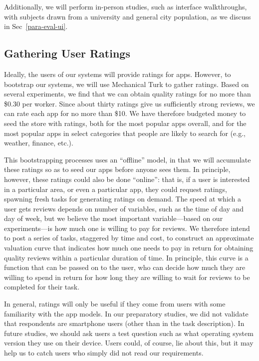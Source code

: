 \documentclass[11pt]{article}
\begin{document}
Additionally, we will perform in-person studies, such as interface
walkthroughs, with subjects drawn from a university and general city
population, as we discuss in Sec~\ref{para-eval-ui}.


\subsection{Gathering User Ratings}
\label{subsec-gather-ratings}

Ideally, the users of our systems will provide ratings for
apps. However, 
to bootstrap our systems, we will use Mechanical Turk to gather
ratings. Based on several experiments, we find that we can obtain
quality ratings for no more than \$0.30 per worker. Since about thirty
ratings give us sufficiently strong reviews, we can rate each
app for no more than \$10. We have therefore budgeted money to
seed the store with ratings, both for the most popular apps overall,
and for the most popular apps in select categories that people are
likely to search for (e.g., weather, finance, etc.).

This bootstrapping processes uses an ``offline'' model, in that we
will accumulate these ratings so as to seed our apps before anyone
sees them. In principle, however, these ratings could also be done
``online'': that is, if a user is interested in a particular area, or
even a particular app, they could request ratings, spawning fresh tasks for
generating ratings on demand. The speed at which a user gets reviews
depends on number of variables, such as the time of day and day of
week, but we believe the most important variable---based on our
experiments---is how much one is willing to pay for reviews. We
therefore intend to post a series of tasks, staggered by time and
cost, to construct an approximate valuation curve that indicates how
much one needs to pay in return for obtaining quality reviews within a
particular duration of time. In principle, this curve is a function
that can be passed on to the user, who can decide how much they are
willing to spend in return for how long they are willing to wait for
reviews to be completed for their task.

In general, ratings will only be useful if they come from users with some
familiarity with the app models.
In our preparatory studies, we did not validate that respondents are
smartphone users (other than in the task description). In future
studies, we should ask users a test question such as what operating
system version they use on their device. Users could, of course, lie
about this, but it may help us to catch users who simply did not read
our requirements.
\end{document}
